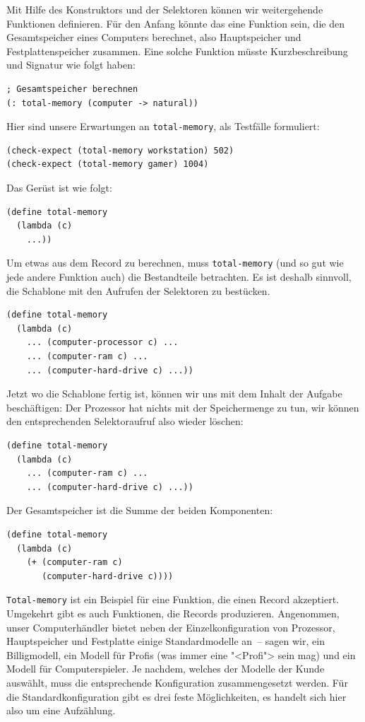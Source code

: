 Mit Hilfe des Konstruktors und der Selektoren können wir weitergehende
Funktionen definieren.
Für den Anfang könnte das
eine Funktion sein, die den Gesamtspeicher eines Computers berechnet,
also Hauptspeicher und Festplattenspeicher zusammen.
Eine solche Funktion müsste Kurzbeschreibung und Signatur wie folgt
haben: 
%
\begin{lstlisting}
; Gesamtspeicher berechnen
(: total-memory (computer -> natural))
\end{lstlisting}
%
Hier sind unsere Erwartungen an \lstinline{total-memory}, als Testfälle
formuliert:
%
\begin{lstlisting}
(check-expect (total-memory workstation) 502)
(check-expect (total-memory gamer) 1004)
\end{lstlisting}
% 
Das Gerüst ist wie folgt:
%
\begin{lstlisting}
(define total-memory
  (lambda (c)
    ...))
\end{lstlisting}
%
Um etwas aus dem Record zu berechnen, muss \lstinline{total-memory} (und
so gut wie jede andere Funktion auch) die Bestandteile betrachten.  Es
ist deshalb sinnvoll, die Schablone mit den Aufrufen der Selektoren zu
bestücken.
%
\begin{lstlisting}
(define total-memory
  (lambda (c)
    ... (computer-processor c) ...
    ... (computer-ram c) ...
    ... (computer-hard-drive c) ...))
\end{lstlisting}
%
Jetzt wo die Schablone fertig ist, können wir uns mit dem Inhalt der
Aufgabe beschäftigen: Der Prozessor hat nichts mit der
Speichermenge zu tun, wir können den entsprechenden Selektoraufruf
also wieder löschen:
%
\begin{lstlisting}
(define total-memory
  (lambda (c)
    ... (computer-ram c) ...
    ... (computer-hard-drive c) ...))
\end{lstlisting}
%
Der Gesamtspeicher ist die Summe der beiden Komponenten:
%
\begin{lstlisting}
(define total-memory
  (lambda (c)
    (+ (computer-ram c)
       (computer-hard-drive c))))
\end{lstlisting}
%
\lstinline{Total-memory} ist ein Beispiel für eine Funktion, die einen
Record akzeptiert.  Umgekehrt gibt es auch Funktionen, die Records
produzieren.  Angenommen, unser Computerhändler bietet neben der
Einzelkonfiguration von Prozessor, Hauptspeicher und Festplatte einige
Standardmodelle an~-- sagen wir, ein Billigmodell, ein Modell für
Profis (was immer eine "<Profi"> sein mag) und ein Modell für
Computerspieler.  Je nachdem, welches der Modelle der Kunde auswählt,
muss die entsprechende Konfiguration zusammengesetzt werden.  Für die
Standardkonfiguration gibt es drei feste Möglichkeiten, es handelt
sich hier also um eine Aufzählung.

